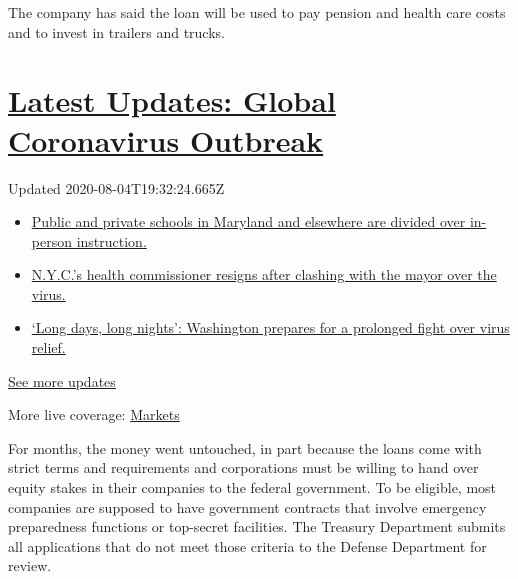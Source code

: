 The company has said the loan will be used to pay pension and health
care costs and to invest in trailers and trucks.

\hypertarget{latest-updates-global-coronavirus-outbreak}{%
\section{\texorpdfstring{\href{https://www.nytimes3xbfgragh.onion/2020/08/04/world/coronavirus-cases.html?action=click\&pgtype=Article\&state=default\&region=MAIN_CONTENT_1\&context=storylines_live_updates}{Latest
Updates: Global Coronavirus
Outbreak}}{Latest Updates: Global Coronavirus Outbreak}}\label{latest-updates-global-coronavirus-outbreak}}

Updated 2020-08-04T19:32:24.665Z

\begin{itemize}
\tightlist
\item
  \href{https://www.nytimes3xbfgragh.onion/2020/08/04/world/coronavirus-cases.html?action=click\&pgtype=Article\&state=default\&region=MAIN_CONTENT_1\&context=storylines_live_updates\#link-4825b93}{Public
  and private schools in Maryland and elsewhere are divided over
  in-person instruction.}
\item
  \href{https://www.nytimes3xbfgragh.onion/2020/08/04/world/coronavirus-cases.html?action=click\&pgtype=Article\&state=default\&region=MAIN_CONTENT_1\&context=storylines_live_updates\#link-4d1eafa8}{N.Y.C.'s
  health commissioner resigns after clashing with the mayor over the
  virus.}
\item
  \href{https://www.nytimes3xbfgragh.onion/2020/08/04/world/coronavirus-cases.html?action=click\&pgtype=Article\&state=default\&region=MAIN_CONTENT_1\&context=storylines_live_updates\#link-6b644638}{`Long
  days, long nights': Washington prepares for a prolonged fight over
  virus relief.}
\end{itemize}

\href{https://www.nytimes3xbfgragh.onion/2020/08/04/world/coronavirus-cases.html?action=click\&pgtype=Article\&state=default\&region=MAIN_CONTENT_1\&context=storylines_live_updates}{See
more updates}

More live coverage:
\href{https://www.nytimes3xbfgragh.onion/live/2020/08/04/business/stock-market-today-coronavirus?action=click\&pgtype=Article\&state=default\&region=MAIN_CONTENT_1\&context=storylines_live_updates}{Markets}

For months, the money went untouched, in part because the loans come
with strict terms and requirements and corporations must be willing to
hand over equity stakes in their companies to the federal government. To
be eligible, most companies are supposed to have government contracts
that involve emergency preparedness functions or top-secret facilities.
The Treasury Department submits all applications that do not meet those
criteria to the Defense Department for review.

